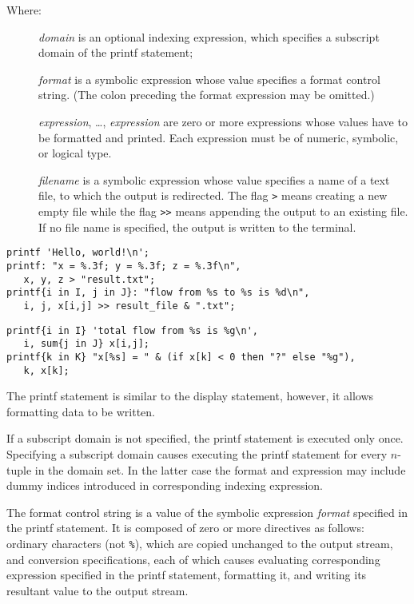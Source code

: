 \documentclass[10pt]{article}
\begin{document}
\begin{description}
\item[{\rm Where:}\hspace*{23pt}] {\it domain} is an optional indexing
expression, which specifies a subscript domain of the printf statement;
\item[\hspace*{54pt}] {\it format} is a symbolic expression whose value
specifies a format control string. (The colon preceding the format
expression may be omitted.)
\item[\hspace*{54pt}] {\it expression}, \dots, {\it expression} are
zero or more expressions whose values have to be formatted and printed.
Each expression must be of numeric, symbolic, or logical type.
\item[\hspace*{54pt}] {\it filename} is a symbolic expression whose
value specifies a name of a text file, to which the output is
redirected. The flag {\tt>} means creating a new empty file while the
flag {\tt>>} means appending the output to an existing file. If no file
name is specified, the output is written to the terminal.
\end{description}


\begin{verbatim}
printf 'Hello, world!\n';
printf: "x = %.3f; y = %.3f; z = %.3f\n",
   x, y, z > "result.txt";
printf{i in I, j in J}: "flow from %s to %s is %d\n",
   i, j, x[i,j] >> result_file & ".txt";
\end{verbatim}

\newpage

\begin{verbatim}
printf{i in I} 'total flow from %s is %g\n',
   i, sum{j in J} x[i,j];
printf{k in K} "x[%s] = " & (if x[k] < 0 then "?" else "%g"),
   k, x[k];
\end{verbatim}

The printf statement is similar to the display statement, however, it
allows formatting data to be written.

If a subscript domain is not specified, the printf statement is
executed only once. Specifying a subscript domain causes executing the
printf statement for every $n$-tuple in the domain set. In the latter
case the format and expression may include dummy indices introduced in
corresponding indexing expression.

The format control string is a value of the symbolic expression
{\it format} specified in the printf statement. It is composed of zero
or more directives as follows: ordinary characters (not {\tt\%}), which
are copied unchanged to the output stream, and conversion
specifications, each of which causes evaluating corresponding
expression specified in the printf statement, formatting it, and
writing its resultant value to the output stream.
\end{document}
